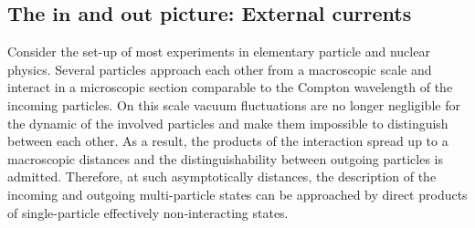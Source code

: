 \documentclass[12pt, titlepage]{article}
\begin{document}
\subsection{The $ \pmb{in} $ and $ \pmb{out}$ picture: External currents}\label{in_out_picture_external_currents}
Consider the set-up of most experiments in elementary particle and nuclear physics. Several particles approach each other from a macroscopic scale and interact in a microscopic section comparable to the Compton wavelength of the incoming particles. On this scale vacuum fluctuations are no longer negligible for the dynamic of the involved particles and make them impossible to distinguish between each other. As a result, the products of the interaction spread up to a macroscopic distances and the distinguishability between outgoing particles is admitted. Therefore, at such asymptotically distances, the description of the incoming and outgoing multi-particle states can be approached by direct products of single-particle effectively non-interacting states.
\end{document}

